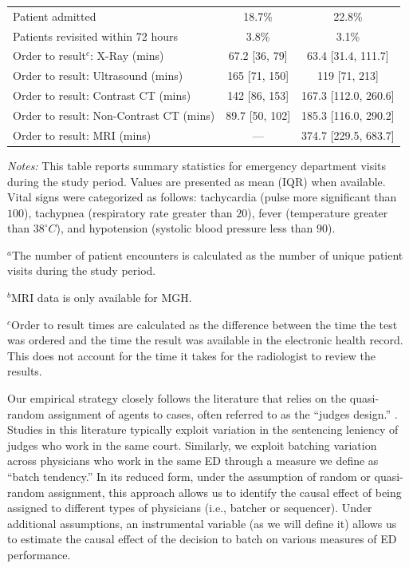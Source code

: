 \documentclass[,,nonblindrev]{informs}
\begin{document}
\begin{table}[h]
\begin{threeparttable}
\begin{tabular}{p{9cm}cc}
Patient admitted & 18.7\% & 22.8\% \\
Patients revisited within 72 hours & 3.8\% & 3.1\% \\
Order to result$^{c}$: X-Ray (mins) & 67.2 [36, 79] & 63.4 [31.4, 111.7] \\
Order to result: Ultrasound (mins) & 165 [71, 150] & 119 [71, 213] \\
Order to result: Contrast CT (mins) & 142 [86, 153] & 167.3 [112.0, 260.6] \\
Order to result: Non-Contrast CT (mins) & 89.7 [50, 102] & 185.3 [116.0, 290.2] \\
Order to result: MRI (mins) & --- & 374.7 [229.5, 683.7] \\
\bottomrule
\end{tabular}
\begin{tablenotes}
\item \footnotesize \textit{Notes:} This table reports summary statistics for emergency department visits during the study period. Values are presented as mean (IQR) when available. Vital signs were categorized as follows: tachycardia (pulse more significant than $100$), tachypnea (respiratory rate greater than $20$), fever (temperature greater than $38^\circ C$), and hypotension (systolic blood pressure less than $90$).
\item \footnotesize $^a$The number of patient encounters is calculated as the number of unique patient visits during the study period.
\item \footnotesize $^b$MRI data is only available for MGH.
\item \footnotesize $^c$Order to result times are calculated as the difference between the time the test was ordered and the time the result was available in the electronic health record. This does not account for the time it takes for the radiologist to review the results.
\end{tablenotes}
\end{threeparttable}
\end{table}

Our empirical strategy closely follows the literature that relies on the
quasi-random assignment of agents to cases, often referred to as the
``judges design.'' \citep[\citet{dobbie2018effects}]{Dahl2014}. Studies
in this literature typically exploit variation in the sentencing
leniency of judges who work in the same court. Similarly, we exploit
batching variation across physicians who work in the same ED through a
measure we define as ``batch tendency.'' In its reduced form, under the
assumption of random or quasi-random assignment, this approach allows us
to identify the causal effect of being assigned to different types of
physicians (i.e., batcher or sequencer). Under additional assumptions,
an instrumental variable (as we will define it) allows us to estimate
the causal effect of the decision to batch on various measures of ED
performance.
\end{document}
